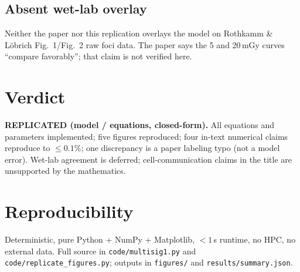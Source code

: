 \documentclass[11pt]{article}
\begin{document}
\subsection{Absent wet-lab overlay}
Neither the paper nor this replication overlays the model on Rothkamm \&
L\"obrich Fig.~1/Fig.~2 raw foci data. The paper says the 5 and 20\,mGy
curves ``compare favorably''; that claim is not verified here.

\section{Verdict}
\textbf{REPLICATED (model / equations, closed-form).} All equations and
parameters implemented; five figures reproduced; four in-text numerical
claims reproduce to $\leq 0.1\%$; one discrepancy is a paper labeling typo
(not a model error). Wet-lab agreement is deferred; cell-communication
claims in the title are unsupported by the mathematics.

\section{Reproducibility}
Deterministic, pure Python + NumPy + Matplotlib, $<1$\,s runtime, no HPC,
no external data. Full source in \texttt{code/multisig1.py} and
\texttt{code/replicate\_figures.py}; outputs in \texttt{figures/} and
\texttt{results/summary.json}.
\end{document}
